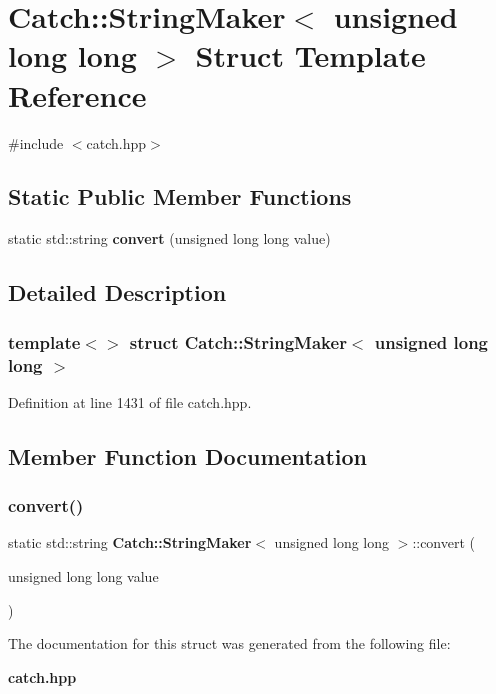 \section{Catch\+::String\+Maker$<$ unsigned long long $>$ Struct Template Reference}
\label{struct_catch_1_1_string_maker_3_01unsigned_01long_01long_01_4}


{\ttfamily \#include $<$catch.\+hpp$>$}

\subsection*{Static Public Member Functions}
\begin{DoxyCompactItemize}
\item 
static std\+::string \textbf{ convert} (unsigned long long value)
\end{DoxyCompactItemize}


\subsection{Detailed Description}
\subsubsection*{template$<$$>$\newline
struct Catch\+::\+String\+Maker$<$ unsigned long long $>$}



Definition at line 1431 of file catch.\+hpp.



\subsection{Member Function Documentation}
\mbox{\label{struct_catch_1_1_string_maker_3_01unsigned_01long_01long_01_4_a6a8708af4fc8df3f52d7eab779b6bc6f}} 
\subsubsection{convert()}
{\footnotesize\ttfamily static std\+::string \textbf{ Catch\+::\+String\+Maker}$<$ unsigned long long $>$\+::convert (\begin{DoxyParamCaption}\item[{unsigned long long}]{value }\end{DoxyParamCaption})\hspace{0.3cm}{\ttfamily [static]}}



The documentation for this struct was generated from the following file\+:\begin{DoxyCompactItemize}
\item 
\textbf{ catch.\+hpp}\end{DoxyCompactItemize}
